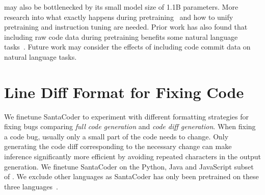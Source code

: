 \modelsc{} may also be bottlenecked by its small model size of 1.1B parameters. More research into what exactly happens during pretraining~\citep{xia2022training,biderman2023emergent} and how to unify pretraining and instruction tuning are needed. Prior work has also found that including raw code data during pretraining benefits some natural language tasks~\citep{muennighoff2023scaling}. Future work may consider the effects of including code commit data on natural language tasks.

\begin{table*}[htbp]
    \centering
    \caption{
        \textbf{Zero-shot pass@1 (\%) performance on \evalf{} of pretraining experiments.}
    }
    \label{tab:humanevalcommit}
\end{table*}



\section{Line Diff Format for Fixing Code}
\label{sec:diffformat}

We finetune SantaCoder to experiment with different formatting strategies for fixing bugs comparing \textit{full code generation} and \textit{code diff generation}. When fixing a code bug, usually only a small part of the code needs to change. Only generating the code diff corresponding to the necessary change can make inference significantly more efficient by avoiding repeated characters in the output generation. We finetune SantaCoder on the Python, Java and JavaScript subset of \dataft{}. We exclude other languages as SantaCoder has only been pretrained on these three languages~\citep{allal2023santacoder}.

